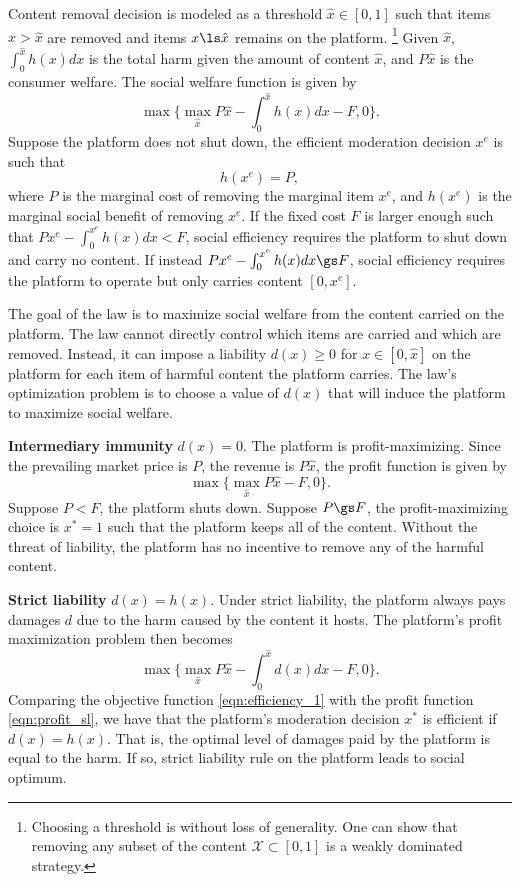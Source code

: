 Content removal decision is modeled as a threshold $\hat{x}\in[0,1]$ such that items $x>\hat{x}$ are removed and items $x\ls\hat{x}$ remains on the platform. 
\footnote{Choosing a threshold is without loss of generality. One can show that removing any subset of the content $\mathcal{X}\subset[0,1]$ is a weakly dominated strategy.}
Given $\hat{x}$, $\int_0^{\hat{x}}h(x)dx$ is the total harm given the amount of content $\hat{x}$, and $P\hat{x}$ is the consumer welfare.
The social welfare function is given by 
\begin{equation}\label{eqn:efficiency_1}
    \max\{\max_{\hat{x}}P\hat{x} - \int_0^{\hat{x}}h(x)dx-F, 0\}.
\end{equation}
Suppose the platform does not shut down, 
the efficient moderation decision $x^e$ is such that
\begin{equation}\label{eqn:efficiency_1_soln}
    h(x^e)=P,
\end{equation}
where $P$ is the marginal cost of removing the marginal item $x^e$, and $h(x^e)$ is the marginal social benefit of removing $x^e$. 
If the fixed cost $F$ is larger enough such that $Px^e - \int_0^{x^e}h(x)dx < F$, social efficiency requires the platform to shut down and carry no content. If instead $Px^e - \int_0^{x^e}h(x)dx \gs F$, social efficiency requires the platform to operate but only carries content $[0,x^e]$.

The goal of the law is to maximize social welfare from the content carried on the platform. The law cannot directly control which items are carried and which are removed. Instead, it can impose a liability $d(x)\ge 0$ for $x\in[0,\hat{x}]$ on the platform for each item of harmful content the platform carries. The law's optimization problem is to choose a value of $d(x)$ that will induce the platform to maximize social welfare.

\textbf{Intermediary immunity} $d(x)=0$.
The platform is profit-maximizing. Since the prevailing market price is $P$, the revenue is $P\hat{x}$, the profit function is given by 
\begin{equation}\label{eqn:profit_ii}
    \max\{\max_{\hat{x}}P\hat{x}-F,0\}.
\end{equation}
Suppose $P<F$, the platform shuts down. Suppose $P\gs F$, the profit-maximizing choice is $x^{\ast}=1$ such that the platform keeps all of the content. Without the threat of liability, the platform has no incentive to remove any of the harmful content. 

\textbf{Strict liability} $d(x)=h(x)$.
Under strict liability, the platform always pays damages $d$ due to the harm caused by the content it hosts. 
The platform's profit maximization problem then becomes
\begin{equation}\label{eqn:profit_sl}
    \max\{\max_{\hat{x}}P\hat{x} - \int_0^{\hat{x}}d(x)dx-F, 0\}.
\end{equation}
Comparing the objective function \eqref{eqn:efficiency_1} with the profit function \eqref{eqn:profit_sl}, we have that the platform's moderation decision $x^{\ast}$ is efficient if $d(x)=h(x)$. 
That is, the optimal level of damages paid by the platform is equal to the harm.
If so, strict liability rule on the platform leads to social optimum. 

